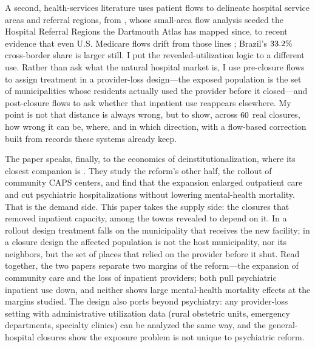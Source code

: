 A second, health-services literature uses patient flows to delineate
hospital service areas and referral regions, from \citet{wennberg1973},
whose small-area flow analysis seeded the Hospital Referral Regions the
Dartmouth Atlas has mapped since, to recent evidence that even U.S. Medicare flows
drift from those lines \citep{wang2020hrr}; Brazil's
$33.2\%$ cross-border share is larger still. I put the
revealed-utilization logic to a different use. Rather than ask what the
natural hospital market is, I use pre-closure flows to assign treatment in a
provider-loss design---the exposed population is the set of municipalities
whose residents actually used the provider before it closed---and
post-closure flows to ask whether that inpatient use reappears elsewhere.
My point is not that distance is always wrong, but to show, across
$60$ real closures, how wrong it can be, where, and in which
direction, with a flow-based correction built from records these systems
already keep.

The paper speaks, finally, to the economics of deinstitutionalization,
where its closest companion is \citet{diasFontes2024}. They study the
reform's other half, the rollout of community CAPS centers, and find that
the expansion enlarged outpatient care and cut psychiatric hospitalizations
without lowering mental-health mortality. That is the demand side. This paper takes the
supply side: the closures that removed inpatient capacity, among the towns
revealed to depend on it. In a rollout design treatment falls on the
municipality that receives the new facility; in a closure design the
affected population is not the host municipality, nor its neighbors, but the
set of places that relied on the provider before it shut. Read together, the
two papers separate two margins of the reform---the expansion of community
care and the loss of inpatient providers; both pull psychiatric inpatient
use down, and neither shows large mental-health mortality effects at the
margins studied. The design also ports beyond psychiatry: any provider-loss
setting with administrative utilization data (rural obstetric units,
emergency departments, specialty clinics) can be analyzed the same way,
and the general-hospital closures show the exposure problem is not unique
to psychiatric reform.
